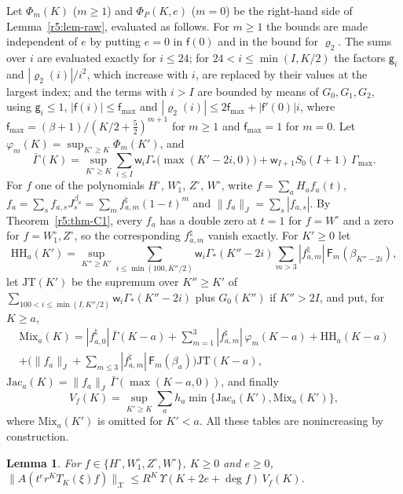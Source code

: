 \documentclass[11pt]{amsart}
\newtheorem{lemma}[theorem]{Lemma}
\theoremstyle{definition}
\theoremstyle{remark}
\numberwithin{equation}{section}
\newcommand{\nrm}[1]{\lVert #1\rVert}
\begin{document}
Let $\Phi_m(K)$ ($m\geq1$) and $\Phi_P(K,e)$ ($m=0$) be the right-hand side of Lemma~\ref{r5:lem-raw}, evaluated as follows. For $m\geq1$ the bounds are made independent of $e$ by putting $e=0$ in $\mathsf f(0)$ and in the bound for $\varrho_2$. The sums over $i$ are evaluated exactly for $i\leq24$; for $24<i\leq\min(I,K/2)$ the factors $\mathsf g_i$ and $|\varrho_2(i)|/i^2$, which increase with $i$, are replaced by their values at the largest index; and the terms with $i>I$ are bounded by means of $G_0,G_1,G_2$, using $\mathsf g_i\leq1$, $|\mathsf f(i)|\leq\mathsf f_{\max}$ and $|\varrho_2(i)|\leq2\mathsf f_{\max}+|\mathsf f'(0)|i$, where $\mathsf f_{\max}=(\beta+1)/(K/2+\frac52)^{m+1}$ for $m\geq1$ and $\mathsf f_{\max}=1$ for $m=0$. Let $\varphi_m(K)=\sup_{K'\geq K}\Phi_m(K')$, and
\[
\bar\Gamma(K)=\sup_{K'\geq K}\sum_{i\leq I}\mathsf w_i\Gamma_*\big(\max(K'-2i,0)\big)+\mathsf w_{I+1}S_0(I+1)\,\Gamma_{\max} .
\]
For $f$ one of the polynomials $H^\circ$, $W^\circ_1$, $Z^\circ$, $W^\circ$, write $f=\sum_aH_af_a(t)$, $f_a=\sum_sf_{a,s}J^{\beta_a}_s=\sum_mf^\natural_{a,m}(1-t)^m$ and $\nrm{f_a}_J=\sum_s|f_{a,s}|$. By Theorem~\ref{r5:thm-C1}, every $f_a$ has a double zero at $t=1$ for $f=W^\circ$ and a zero for $f=W^\circ_1,Z^\circ$, so the corresponding $f^\natural_{a,m}$ vanish exactly. For $K'\geq0$ let
\[
\mathrm{HH}_a(K')=\sup_{K''\geq K'}\sum_{i\leq\min(100,K''/2)}\mathsf w_i\Gamma_*(K''-2i)\sum_{m>3}|f^\natural_{a,m}|\,\mathsf F_m(\beta_{K''-2i}),
\]
let $\mathrm{JT}(K')$ be the supremum over $K''\geq K'$ of $\sum_{100<i\leq\min(I,K''/2)}\mathsf w_i\Gamma_*(K''-2i)$ plus $G_0(K'')$ if $K''>2I$, and put, for $K\geq a$,
\begin{multline*}
\mathrm{Mix}_a(K)=|f^\natural_{a,0}|\,\bar\Gamma(K-a)+\sum_{m=1}^3|f^\natural_{a,m}|\,\varphi_m(K-a)+\mathrm{HH}_a(K-a)\\
+\Big(\nrm{f_a}_J+\sum_{m\leq3}|f^\natural_{a,m}|\,\mathsf F_m(\beta_a)\Big)\mathrm{JT}(K-a),
\end{multline*}
$\mathrm{Jac}_a(K)=\nrm{f_a}_J\,\bar\Gamma(\max(K-a,0))$, and finally
\[
V_f(K)=\sup_{K'\geq K}\sum_ah_a\min\{\mathrm{Jac}_a(K'),\mathrm{Mix}_a(K')\},
\]
where $\mathrm{Mix}_a(K')$ is omitted for $K'<a$. All these tables are nonincreasing by construction.

\begin{lemma}\label{r5:lem-centre}
For $f\in\{H^\circ,W^\circ_1,Z^\circ,W^\circ\}$, $K\geq0$ and $e\geq0$, $\nrm{A(t^er^KT_K(\xi)f)}_{\mathcal X}\leq R^K\,\Upsilon(K+2e+\deg f)\,V_f(K)$.
\end{lemma}
\end{document}
